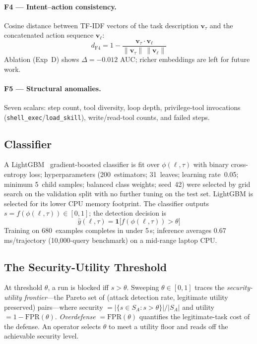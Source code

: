 \documentclass[conference]{IEEEtran}
\begin{document}
\paragraph{F4 --- Intent--action consistency.}
Cosine distance between TF-IDF vectors of the task description
$\mathbf{v}_\tau$ and the concatenated action sequence $\mathbf{v}_\ell$:
\[d_{\mathrm{F4}} = 1 - \frac{\mathbf{v}_\tau\cdot\mathbf{v}_\ell}{\|\mathbf{v}_\tau\|\,\|\mathbf{v}_\ell\|}\]
Ablation (Exp~D) shows $\Delta{=}{-}0.012$ AUC; richer embeddings
are left for future work.

\paragraph{F5 --- Structural anomalies.}
Seven scalars: step count, tool diversity, loop depth,
privilege-tool invocations (\texttt{shell\_exec}/\texttt{load\_skill}),
write/read-tool counts, and failed steps.

\subsection{Classifier}

A LightGBM~\cite{ke2017lightgbm} gradient-boosted classifier is fit
over $\phi(\ell,\tau)$ with binary cross-entropy loss; hyperparameters
(200~estimators; 31~leaves; learning rate~0.05; minimum 5~child
samples; balanced class weights; seed~42) were selected by grid
search on the validation split with no further tuning on the test set.
LightGBM is selected for its lower CPU memory footprint.  The
classifier outputs $s{=}f(\phi(\ell,\tau))\in[0,1]$; the detection
decision is
\[\hat{y}(\ell,\tau)=\mathbf{1}\bigl[f(\phi(\ell,\tau))>\theta\bigr]\]
Training on 680~examples completes in under 5\,s; inference averages
0.67\,ms/trajectory (10{,}000-query benchmark) on a mid-range laptop CPU.

\subsection{The Security-Utility Threshold}
\label{sec:threshold}

At threshold $\theta$, a run is blocked iff $s > \theta$.  Sweeping
$\theta \in [0,1]$ traces the \emph{security-utility frontier}---the
Pareto set of (attack detection rate, legitimate utility preserved)
pairs---where security $= |\{s \!\in\! S_A : s > \theta\}|/|S_A|$
and utility $= 1 - \mathrm{FPR}(\theta)$.  \emph{Overdefense}
$= \mathrm{FPR}(\theta)$ quantifies the legitimate-task cost of the
defense.  An operator selects $\theta$ to meet a utility floor and
reads off the achievable security level.
\end{document}
